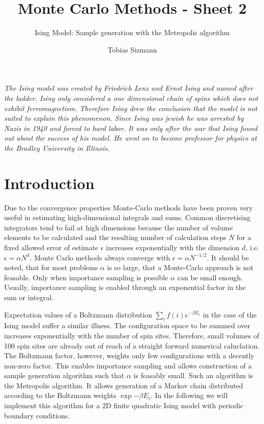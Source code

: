 \documentclass[11pt, a4paper]{scrartcl}
\title{Monte Carlo Methods - Sheet 2}
\subtitle{Ising Model: Sample generation with the Metropolis algorithm}
\author{Tobias Sizmann}
\begin{document}
\maketitle
\textit{The Ising model was created by Friedrich Lenz and Ernst Ising and named after the ladder. Ising only considered a one dimensional chain of spins which does not exhibit ferromagnetism. Therefore Ising drew the conclusion that the model is not suited to explain this phenomenon. Since Ising was jewish he was arrested by Nazis in 1940 and forced to hard labor. It was only after the war that Ising found out about the success of his model. He went on to become professor for physics at the Bradley University in Illinois.}
\section{Introduction}
Due to the convergence properties Monte-Carlo methods have been proven very useful in estimating high-dimensional integrals and sums. Common discretising integrators tend to fail at high dimensions because the number of volume elements to be calculated and the resulting number of calculation steps $N$ for a fixed allowed error of estimate $\epsilon$ increases exponentially with the dimension $d$, i.e. $\epsilon = \alpha N^d$. Monte Carlo methods always converge with $\epsilon = \alpha N^{-1/2}$. It should be noted, that for most problems $\alpha$ is so large, that a Monte-Carlo approach is not feasable. Only when importance sampling is possible $\alpha$ can be small enough. Usually, importance sampling is enabled through an exponential factor in the sum or integral.

Expectation values of a Boltzmann distribution $\sum_i f(i) e^{-\beta E_i}$ in the case of the Ising model suffer a similar illness. The configuration space to be summed over increases exponentially with the number of spin sites. Therefore, small volumes of 100 spin sites are already out of reach of a straight forward numerical caluclation. The Boltzmann factor, however, weights only few configurations with a decently non-zero factor. This enables importance sampling and allows construction of a sample generation algorithm such that $\alpha$ is feasably small. Such an algorithm is the Metropolis algorithm. It allows generation of a Markov chain distributed according to the Boltzmann weights $\exp{-\beta E_i}$. In the following we will implement this algorithm for a 2D finite quadratic Ising model with periodic boundary conditions.
\end{document}
